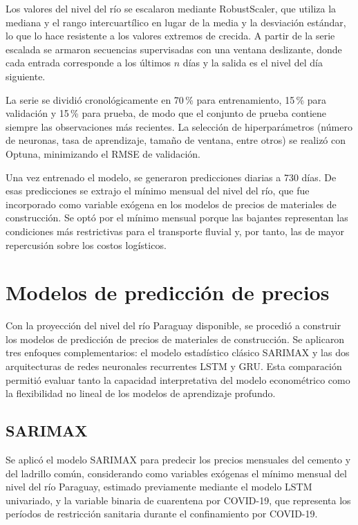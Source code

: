 \justify
Los valores del nivel del río se escalaron mediante RobustScaler, que utiliza la mediana y el rango intercuartílico en lugar de la media y la desviación estándar, lo que lo hace resistente a los valores extremos de crecida. A partir de la serie escalada se armaron secuencias supervisadas con una ventana deslizante, donde cada entrada corresponde a los últimos $n$ días y la salida es el nivel del día siguiente.

\justify
La serie se dividió cronológicamente en 70\,\% para entrenamiento, 15\,\% para validación y 15\,\% para prueba, de modo que el conjunto de prueba contiene siempre las observaciones más recientes. La selección de hiperparámetros (número de neuronas, tasa de aprendizaje, tamaño de ventana, entre otros) se realizó con Optuna, minimizando el RMSE de validación.

\justify
Una vez entrenado el modelo, se generaron predicciones diarias a 730 días. De esas predicciones se extrajo el mínimo mensual del nivel del río, que fue incorporado como variable exógena en los modelos de precios de materiales de construcción. Se optó por el mínimo mensual porque las bajantes representan las condiciones más restrictivas para el transporte fluvial y, por tanto, las de mayor repercusión sobre los costos logísticos.

\section{Modelos de predicción de precios}
\justify
Con la proyección del nivel del río Paraguay disponible, se procedió a construir los modelos de predicción de precios de materiales de construcción. Se aplicaron tres enfoques complementarios: el modelo estadístico clásico SARIMAX y las dos arquitecturas de redes neuronales recurrentes LSTM y GRU. Esta comparación permitió evaluar tanto la capacidad interpretativa del modelo econométrico como la flexibilidad no lineal de los modelos de aprendizaje profundo.

\subsection{SARIMAX}
\justify
Se aplicó el modelo SARIMAX para predecir los precios mensuales del cemento y del ladrillo común, considerando como variables exógenas el mínimo mensual del nivel del río Paraguay, estimado previamente mediante el modelo LSTM univariado, y la variable binaria de cuarentena por COVID-19, que representa los períodos de restricción sanitaria durante el confinamiento por COVID-19.

